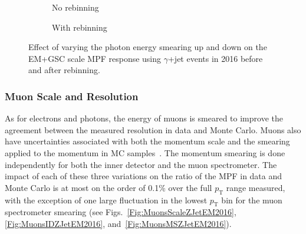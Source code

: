 \begin{figure}[!ht]
  \centering
  \begin{subfigure}{.5\textwidth}
    \centering
    \caption{No rebinning}
  \end{subfigure}%
  \begin{subfigure}{.5\textwidth}  \centering
    \caption{With rebinning}
  \end{subfigure}
  \caption{Effect of varying the photon energy smearing up and down on the EM+GSC scale MPF response using $\gamma$+jet events in 2016 before and after rebinning. }
  \label{Fig:EGResolutionGJetEM2016}
\end{figure}

\subsubsection{Muon Scale and Resolution}
As for electrons and photons, the energy of muons is smeared to improve the agreement between the measured resolution in data and Monte Carlo.  
Muons also have uncertainties associated with both the momentum scale and the smearing applied to the momentum in MC samples~\cite{Aad:2016jkr}.  
The momentum smearing is done independently for both the inner detector and the muon spectrometer.  
The impact of each of these three variations on the ratio of the MPF in data and Monte Carlo is at most on the order of 0.1\% over the full $p_{\mathrm T}$ range measured, with the exception of one large fluctuation in the lowest $p_{\mathrm T}$ bin for the muon spectrometer smearing (see Figs.~\ref{Fig:MuonsScaleZJetEM2016}, \ref{Fig:MuonsIDZJetEM2016}, and~\ref{Fig:MuonsMSZJetEM2016}).  





